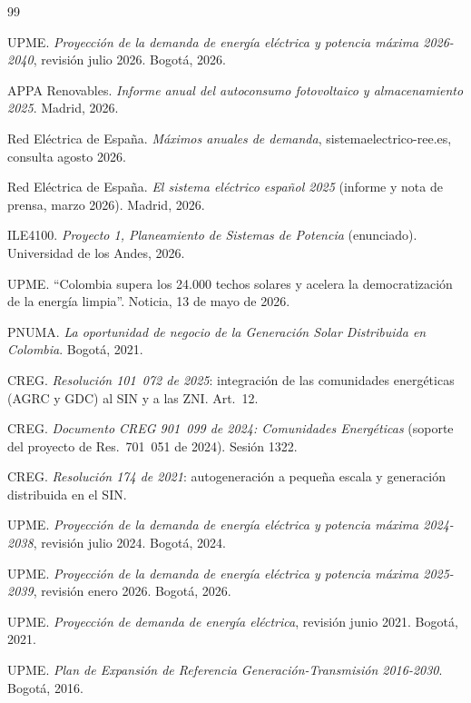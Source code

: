 \documentclass[11pt,letterpaper]{article}
\begin{document}
\begingroup
\small
\begin{thebibliography}{99}\setlength{\itemsep}{1pt}

 UPME. \emph{Proyección de la demanda de energía eléctrica y
potencia máxima 2026-2040}, revisión julio 2026. Bogotá, 2026.

 APPA Renovables. \emph{Informe anual del autoconsumo
fotovoltaico y almacenamiento 2025}. Madrid, 2026.

 Red Eléctrica de España. \emph{Máximos anuales de demanda},
sistemaelectrico-ree.es, consulta agosto 2026.

 Red Eléctrica de España. \emph{El sistema eléctrico español
2025} (informe y nota de prensa, marzo 2026). Madrid, 2026.

 ILE4100. \emph{Proyecto 1, Planeamiento de Sistemas de
Potencia} (enunciado). Universidad de los Andes, 2026.

 UPME. ``Colombia supera los 24.000 techos solares y
acelera la democratización de la energía limpia''. Noticia, 13 de mayo de 2026.

 PNUMA. \emph{La oportunidad de negocio de la Generación
Solar Distribuida en Colombia}. Bogotá, 2021.

 CREG. \emph{Resolución 101~072 de 2025}: integración de
las comunidades energéticas (AGRC y GDC) al SIN y a las ZNI. Art.~12.

 CREG. \emph{Documento CREG 901~099 de 2024: Comunidades
Energéticas} (soporte del proyecto de Res.\ 701~051 de 2024). Sesión 1322.

 CREG. \emph{Resolución 174 de 2021}: autogeneración a
pequeña escala y generación distribuida en el SIN.

 UPME. \emph{Proyección de la demanda de energía eléctrica y
potencia máxima 2024-2038}, revisión julio 2024. Bogotá, 2024.

 UPME. \emph{Proyección de la demanda de energía
eléctrica y potencia máxima 2025-2039}, revisión enero 2026. Bogotá, 2026.

 UPME. \emph{Proyección de demanda de energía eléctrica},
revisión junio 2021. Bogotá, 2021.

 UPME. \emph{Plan de Expansión de Referencia
Generación-Transmisión 2016-2030}. Bogotá, 2016.


\end{thebibliography}
\end{document}
